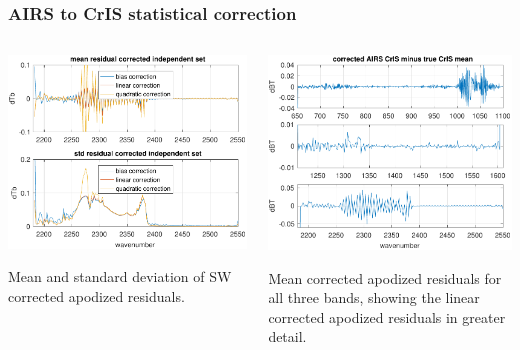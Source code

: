 \documentclass[10pt]{beamer}
\begin{document}
\begin{frame}
\frametitle{AIRS to CrIS statistical correction}
\begin{columns}[t]
\begin{column}{0.5\textwidth}  
  \begin{centering}
  \includegraphics[width=\textwidth]{figures/a2cris_regr_SW.pdf}
  \end{centering}\vspace{3mm}
  Mean and standard deviation of SW corrected apodized residuals.

\end{column}
\begin{column}{0.5\textwidth}
  \begin{centering}
  \includegraphics[width=\textwidth]{figures/ap_decon_corr.pdf}
  \end{centering}\vspace{3mm}
  Mean corrected apodized residuals for all three bands, showing
  the linear corrected apodized residuals in greater detail.
\end{column}
\end{columns}
\end{frame}
\end{document}
